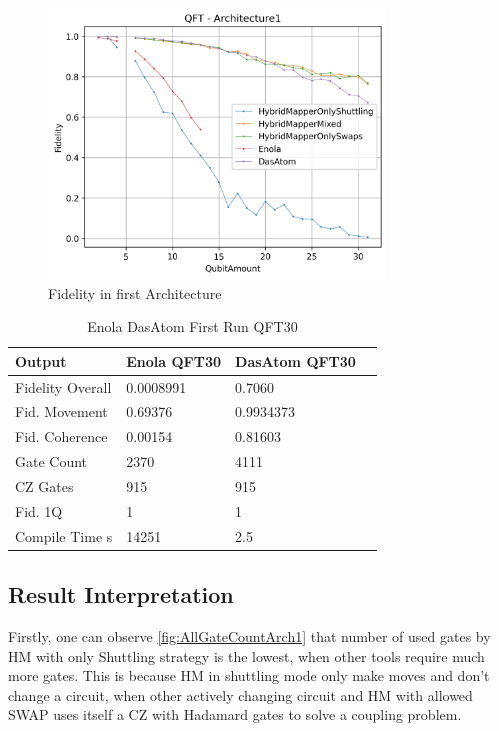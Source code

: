 \begin{figure}[htbp]
  \centering
    \includegraphics[width=0.8\textwidth]{figures/FidelityArch1.png}
    \caption[Fidelity in first Architecture]{Fidelity in first Architecture}
    \label{fig:FidelityArch1}
\end{figure}
\begin{table}[htpb]
  \caption[Enola DasAtom First Run QFT30]{Enola DasAtom First Run QFT30}\label{tab:EnolaDasAtomQFT30}
  \centering
  \begin{tabular}{l l l l}
    \toprule
      Output & Enola QFT30 & DasAtom QFT30 \\
    \midrule
      Fidelity Overall & 0.0008991 & 0.7060\\
      Fid. Movement & 0.69376 & 0.9934373\\
      Fid. Coherence & 0.00154 & 0.81603\\
      Gate Count & 2370 & 4111\\
      CZ Gates & 915 & 915\\
      Fid. 1Q & 1 & 1\\
      Compile Time s & 14251 & 2.5\\
    \bottomrule
  \end{tabular}
\end{table}

\subsection{Result Interpretation}
Firstly, one can observe \ref{fig:AllGateCountArch1} that number of used gates by \ac{HM} with only Shuttling strategy is the lowest, 
when other tools require much more gates. This is because \ac{HM} in shuttling mode only make moves and don't change a circuit,
when other actively changing circuit and \ac{HM} with allowed SWAP uses itself a CZ with Hadamard gates to solve a coupling problem.

